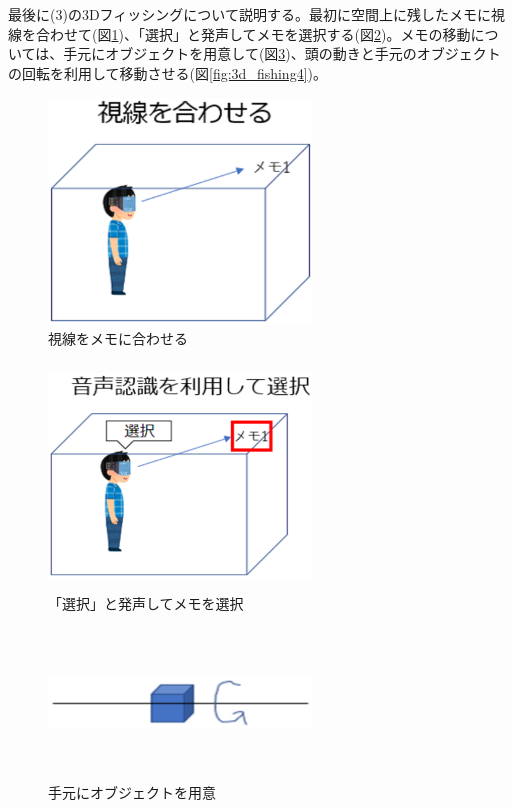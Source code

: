 \documentclass[11pt,a4j, titlepage]{jarticle} %
\begin{document}
最後に(3)の3Dフィッシングについて説明する。最初に空間上に残したメモに視線を合わせて(図\ref{fig:3d_fishing})、「選択」と発声してメモを選択する(図\ref{fig:3d_fishing2})。メモの移動については、手元にオブジェクトを用意して(図\ref{fig:3d_fishing3})、頭の動きと手元のオブジェクトの回転を利用して移動させる(図\ref{fig:3d_fishing4})。

\begin{figure}[H]
  \begin{center}
    \includegraphics[clip,height=6.0cm,width=7.0cm]{./3d_fishing.eps}
    \caption{視線をメモに合わせる}
    \label{fig:3d_fishing}
  \end{center}
\end{figure}

\begin{figure}[H]
  \begin{center}
    \includegraphics[clip,height=6.0cm,width=7.0cm]{./3d_fishing2.eps}
    \caption{「選択」と発声してメモを選択}
    \label{fig:3d_fishing2}
  \end{center}
\end{figure}

\begin{figure}[H]
  \begin{center}
    \includegraphics[clip,height=4.0cm,width=7.0cm]{./3d_fishing3.eps}
    \caption{手元にオブジェクトを用意}
    \label{fig:3d_fishing3}
  \end{center}
\end{figure}
\end{document}
